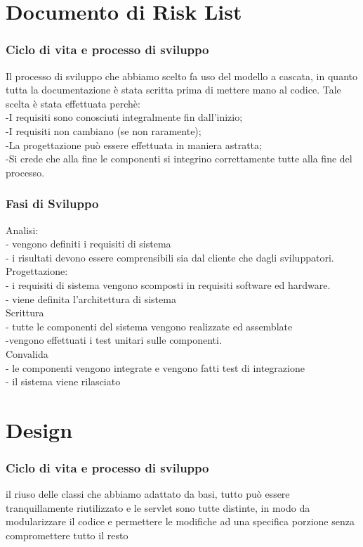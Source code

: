 \documentclass[a4paper,12pt]{beamer}
\begin{document}
\section{Documento di Risk List}
\begin{frame}
\frametitle{Ciclo di vita e processo di sviluppo}
Il processo di sviluppo che abbiamo scelto fa uso del modello a cascata, in quanto tutta la documentazione è stata scritta prima di mettere mano al codice. Tale scelta è stata effettuata perchè:\\
-I requisiti sono conosciuti integralmente fin dall’inizio;\\
-I requisiti non cambiano (se non raramente);\\
-La progettazione può essere effettuata in maniera astratta;\\
-Si crede che alla fine le componenti si integrino correttamente tutte alla fine del processo.\\
\end{frame}

\begin{frame}
\frametitle{Fasi di Sviluppo}
Analisi:\\
- vengono definiti i requisiti di sistema\\
- i risultati devono essere comprensibili sia dal cliente che dagli sviluppatori.\\
Progettazione:\\
- i requisiti di sistema vengono scomposti in requisiti software ed hardware.\\
- viene definita l’architettura di sistema\\
Scrittura \\
- tutte le componenti del sistema vengono realizzate ed assemblate  \\
-vengono effettuati i test unitari sulle componenti.\\
Convalida\\
- le componenti vengono integrate e vengono fatti test di integrazione\\
- il sistema viene rilasciato\\
\end{frame}

\pagebreak

\section{Design}
\begin{frame}
\frametitle{Ciclo di vita e processo di sviluppo}
il riuso delle classi che abbiamo adattato da basi, tutto può essere tranquillamente riutilizzato e le servlet sono tutte distinte, in modo da modularizzare il codice e permettere le modifiche ad una specifica porzione senza compromettere tutto il resto
\end{frame}
\end{document}
